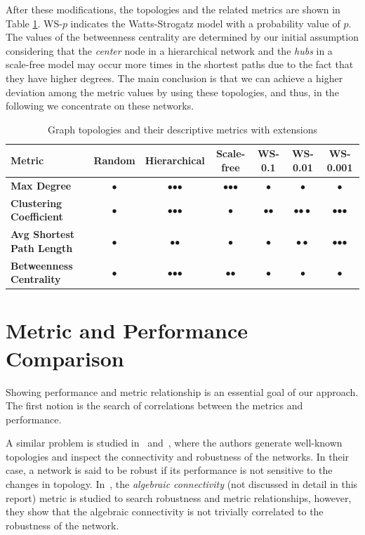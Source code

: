 After these modifications, the topologies and the related metrics are shown in Table \ref{tab:topology_metrics2}. WS-$p$ indicates the Watts-Strogatz model with a probability value of $p$. The values of the betweenness centrality are determined by our initial assumption considering that the \textit{center} node in a hierarchical network and the \textit{hubs} in a scale-free model may occur more times in the shortest paths due to the fact that they have higher degrees. The main conclusion is that we can achieve a higher deviation among the metric values by using these topologies, and thus, in the following we concentrate on these networks.
\begin{table}[ht]
	\footnotesize
	\centering
	
	\begin{tabular}{ l c c c c c c}
		\toprule
		Metric & Random & Hierarchical & Scale-free & WS-0.1 & WS-0.01 & WS-0.001 \\ 
		\midrule 
		\textbf{Max Degree} & $\bullet$ & $\bullet$$\bullet$$\bullet$ & $\bullet$$\bullet$$\bullet$ & $\bullet$ & $\bullet$ & $\bullet$ \\ \hline
		\textbf{Clustering Coefficient} & $\bullet$ & $\bullet$$\bullet$$\bullet$ & $\bullet$ & $\bullet$$\bullet$ & $\bullet$$\bullet \bullet$ & $\bullet$$\bullet$$\bullet$\\ \hline
		\textbf{Avg Shortest Path Length} & $\bullet$ & $\bullet$$\bullet$ & $\bullet$ & $\bullet $ & $\bullet \bullet$ & $\bullet$$\bullet$$\bullet$\\ \hline
		\textbf{Betweenness Centrality} & $\bullet$ & $\bullet$$\bullet$$\bullet$ & $\bullet$$\bullet$ & $\bullet$ & $\bullet$ & $\bullet$\\ \hline
		\bottomrule
	\end{tabular}
	\caption{Graph topologies and their descriptive metrics with extensions}
	\label{tab:topology_metrics2}
\end{table}

\section{Metric and Performance Comparison}

Showing performance and metric relationship is an essential goal of our approach. The first notion is the search of correlations between the metrics and performance.

A similar problem is studied in~\cite{algebraic1} and~\cite{algebraic2}, where the authors generate well-known topologies and inspect the connectivity and robustness of the networks. In their case, a network is said to be robust if its performance is not sensitive to the changes in topology. In~\cite{algebraic1}, the \emph{algebraic connectivity} (not discussed in detail in this report) metric is studied to search robustness and metric relationships, however, they show that the algebraic connectivity is not trivially correlated to the robustness of the network.

